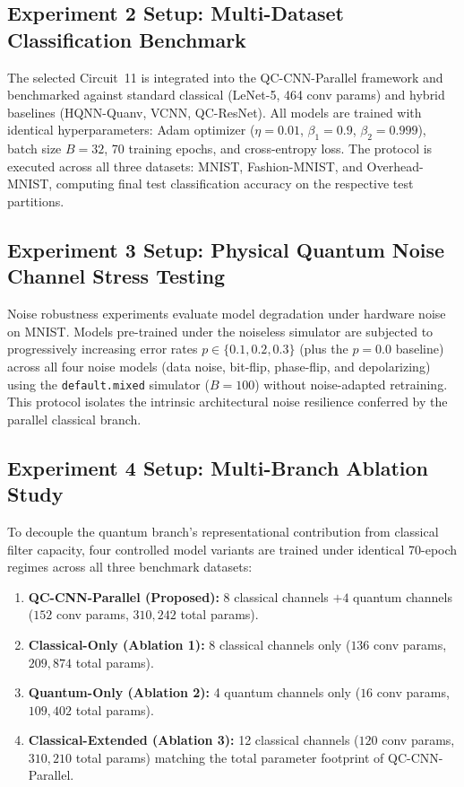 \documentclass[journal]{IEEEtran}
\begin{document}
\subsection{Experiment 2 Setup: Multi-Dataset Classification Benchmark}
The selected Circuit~11 is integrated into the QC-CNN-Parallel framework and benchmarked against standard classical (LeNet-5, 464 conv params) and hybrid baselines (HQNN-Quanv, VCNN, QC-ResNet). All models are trained with identical hyperparameters: Adam optimizer ($\eta = 0.01$, $\beta_1 = 0.9$, $\beta_2 = 0.999$), batch size $B = 32$, 70 training epochs, and cross-entropy loss. The protocol is executed across all three datasets: MNIST, Fashion-MNIST, and Overhead-MNIST, computing final test classification accuracy on the respective test partitions.

\subsection{Experiment 3 Setup: Physical Quantum Noise Channel Stress Testing}
Noise robustness experiments evaluate model degradation under hardware noise on MNIST. Models pre-trained under the noiseless simulator are subjected to progressively increasing error rates $p \in \{0.1, 0.2, 0.3\}$ (plus the $p=0.0$ baseline) across all four noise models (data noise, bit-flip, phase-flip, and depolarizing) using the \texttt{default.mixed} simulator ($B=100$) without noise-adapted retraining. This protocol isolates the intrinsic architectural noise resilience conferred by the parallel classical branch.

\subsection{Experiment 4 Setup: Multi-Branch Ablation Study}
To decouple the quantum branch's representational contribution from classical filter capacity, four controlled model variants are trained under identical 70-epoch regimes across all three benchmark datasets:
\begin{enumerate}
    \item \textbf{QC-CNN-Parallel (Proposed):} 8 classical channels $+ 4$ quantum channels ($152$ conv params, $310,242$ total params).
    \item \textbf{Classical-Only (Ablation 1):} 8 classical channels only ($136$ conv params, $209,874$ total params).
    \item \textbf{Quantum-Only (Ablation 2):} 4 quantum channels only ($16$ conv params, $109,402$ total params).
    \item \textbf{Classical-Extended (Ablation 3):} 12 classical channels ($120$ conv params, $310,210$ total params) matching the total parameter footprint of QC-CNN-Parallel.
\end{enumerate}
\end{document}
